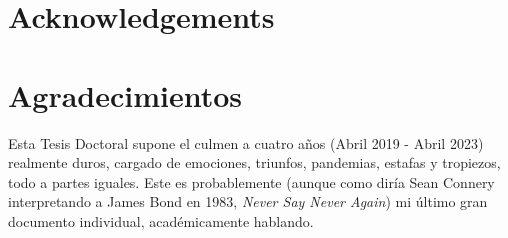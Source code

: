 %
%
%
% 
%
%
%
%

\thispagestyle{empty}

{
  \chapter*{Acknowledgements}
  \label{cha:acknowledgements}
}
{
  \chapter*{Agradecimientos}
  \label{cha:agradecimientos}
}


Esta Tesis Doctoral supone el culmen a cuatro años (Abril 2019 - Abril 2023) realmente duros, cargado de emociones, triunfos, pandemias, estafas y tropiezos, todo a partes iguales. Este es probablemente (aunque como diría Sean Connery interpretando a James Bond en 1983, \textit{Never Say Never Again}) mi último gran documento individual, académicamente hablando. \\ 

